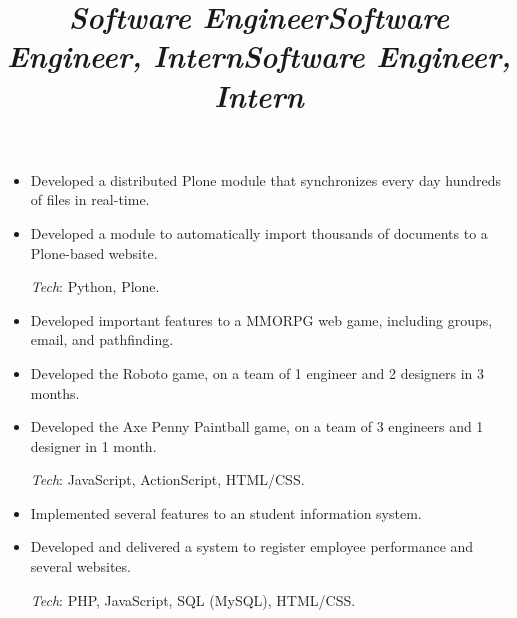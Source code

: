 \begin{resume}
\title{\emph{Software Engineer}}
\begin{position}
\vspace{1mm}
\begin{itemize}\small
\item Developed a distributed Plone module that synchronizes every day hundreds
  of files in real-time.
\item Developed a module to automatically import thousands of documents to a Plone-based website.

\vspace{1mm}
{\small \emph{Tech}: Python, Plone\@.}
\end{itemize}
\end{position}

\title{\emph{Software Engineer, Intern}}
\begin{position}
\vspace{1mm}
\begin{itemize}\small
\item Developed important features to a MMORPG web game, including groups,
  email, and pathfinding.
\item Developed the Roboto game, on a team of 1 engineer and 2 designers in
  3 months.
\item Developed the Axe Penny Paintball game, on a team of 3 engineers and
  1 designer in 1 month.

\vspace{1mm}
{\small \emph{Tech}: JavaScript, ActionScript, HTML/CSS\@.}
\end{itemize}
\end{position}

\title{\emph{Software Engineer, Intern}}
\begin{position}
\vspace{1mm}
\begin{itemize}\small
\item Implemented several features to an student information system.
\item Developed and delivered a system to register employee performance and
  several websites.

\vspace{1mm}
{\small \emph{Tech}: PHP, JavaScript, SQL (MySQL), HTML/CSS\@.}
\end{itemize}
\end{position}


\end{resume}
